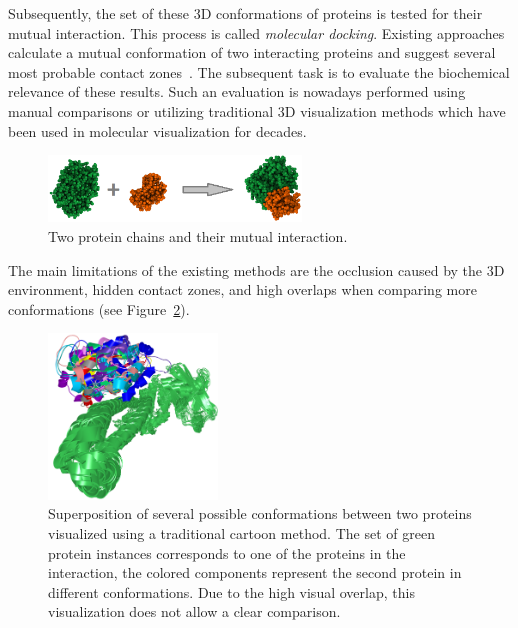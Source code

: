 \documentclass[11pt,a4paper,titlepage,oneside,onecolumn]{article}
\begin{document}
Subsequently, the set of these 3D conformations of proteins is tested for their mutual interaction. 
This process is called \textit{molecular docking}. 
Existing approaches calculate a mutual conformation of two interacting proteins and suggest several most probable contact zones~\cite{huang}. 
The subsequent task is to evaluate the biochemical relevance of these results. 
Such an evaluation is nowadays performed using manual comparisons or utilizing traditional 3D visualization methods which have been used in molecular visualization for decades.
\setlength\intextsep{0pt}
\begin{figure}
  \vspace{-5mm}
	\begin{center}
  \includegraphics[width=0.6\textwidth]{pics/docking.png}
	\end{center}
	\vspace{-5mm}
  \caption{Two protein chains and their mutual interaction.}
  \label{fig:dock}
\end{figure}
The main limitations of the existing methods are the occlusion caused by the 3D environment, hidden contact zones, and high overlaps when comparing more conformations (see Figure~\ref{fig:problem}).

\setlength\intextsep{0pt}
\begin{figure}
\vspace{-5mm}
\begin{center}
\includegraphics[width=0.4\textwidth]{pics/problem.png}
\end{center}
\vspace{-5mm}
\caption{Superposition of several possible conformations between two proteins visualized using a traditional cartoon method. The set of green protein instances corresponds to one of the proteins in the interaction, the colored components represent the second protein in different conformations. Due to the high visual overlap, this visualization does not allow a clear comparison.}
\label{fig:problem}
\end{figure}
\end{document}
